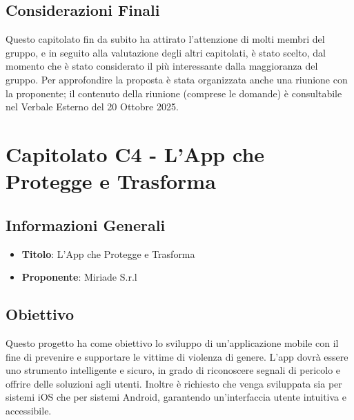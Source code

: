 \documentclass[a4paper,12pt]{article}
\begin{document}
    \subsection{Considerazioni Finali}
    Questo capitolato fin da subito ha attirato l'attenzione di molti membri del gruppo, e in seguito alla valutazione degli altri capitolati, è stato scelto, dal momento che è stato considerato il più interessante dalla maggioranza del gruppo. Per approfondire la proposta è stata organizzata anche una riunione con la proponente; il contenuto della riunione (comprese le domande) è consultabile nel Verbale Esterno del 20 Ottobre 2025.

    \section{Capitolato C4 - L’App che Protegge e Trasforma}
    \subsection{Informazioni Generali}
        \begin{itemize}
            \item \textbf{Titolo}: L’App che Protegge e Trasforma
            \item \textbf{Proponente}: Miriade S.r.l
        \end{itemize}
    \subsection{Obiettivo}
    Questo progetto ha come obiettivo lo sviluppo di un’applicazione mobile con il fine di prevenire e supportare le vittime di violenza di genere. L’app dovrà essere uno strumento intelligente e sicuro, in grado di riconoscere segnali di pericolo e offrire delle soluzioni agli utenti. Inoltre è richiesto che venga sviluppata sia per sistemi iOS che per sistemi Android, garantendo un’interfaccia utente intuitiva e accessibile.
\end{document}
